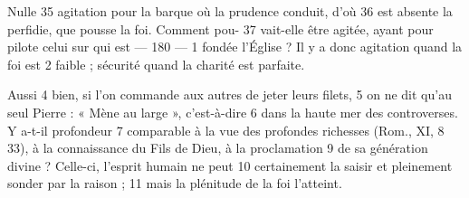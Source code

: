 Nulle	 
35	 	agitation pour la barque où la prudence conduit, d'où	 
36	 	est absente la perfidie, que pousse la foi. Comment pou-	 
37	 	vait-elle être agitée, ayant pour pilote celui sur qui est	 
 	--- 180 ---	 
1	 	fondée l'Église ? Il y a donc agitation quand la foi est	 
2	 	faible ; sécurité quand la charité est parfaite.

Aussi	 
4	 	bien, si l'on commande aux autres de jeter leurs filets,	 
5	 	on ne dit qu'au seul Pierre : « Mène au large », c'est-à-dire	 
6	 	dans la haute mer des controverses. Y a-t-il profondeur	 
7	 	comparable à la vue des profondes richesses (Rom., XI,	 
8	 	33), à la connaissance du Fils de Dieu, à la proclamation	 
9	 	de sa génération divine ? Celle-ci, l'esprit humain ne peut	 
10	 	certainement la saisir et pleinement sonder par la raison ;	 
11	 	mais la plénitude de la foi l'atteint.